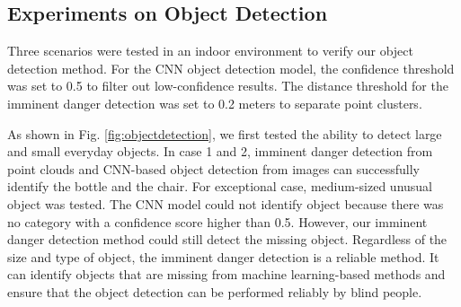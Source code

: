 \documentclass{ieeeaccess}
\begin{document}
\subsection{Experiments on Object Detection}
Three scenarios were tested in an indoor environment to verify our object detection method. For the CNN object detection model, the confidence threshold was set to 0.5 to filter out low-confidence results. The distance threshold for the imminent danger detection was set to 0.2 meters to separate point clusters.


As shown in Fig. \ref{fig:objectdetection}, we first tested the ability to detect large and small everyday objects. In case 1 and 2, imminent danger detection from point clouds and CNN-based object detection from images can successfully identify the bottle and the chair.
For exceptional case, medium-sized unusual object was tested. The CNN model could not identify object because there was no category with a confidence score higher than 0.5. However, our imminent danger detection method could still detect the missing object. Regardless of the size and type of object, the imminent danger detection is a reliable method. It can identify objects that are missing from machine learning-based methods and ensure that the object detection can be performed reliably by blind people.







\end{document}
